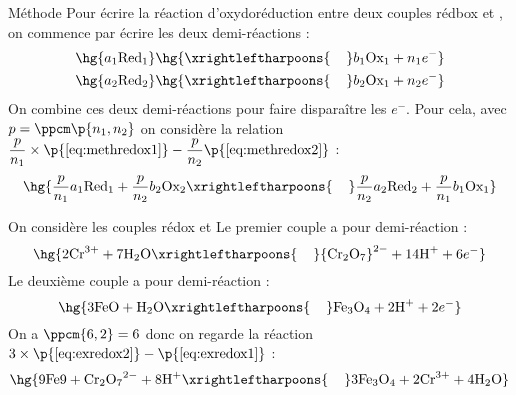     \begin{form}{Méthode}{}
        Pour écrire la réaction d'oxydoréduction entre deux couples rédbox  et , on commence par écrire les deux demi-réactions :
        \begin{align}
            \label{eq:methredox1}\hg{a_1\text{Red}_1} &\hg{\xrightleftharpoons{\hspace{0.4cm}} b_1\text{Ox}_1 + n_1e^-}\\
            \label{eq:methredox2}\hg{a_2\text{Red}_2} &\hg{\xrightleftharpoons{\hspace{0.4cm}} b_2\text{Ox}_1 + n_2e^-}
        \end{align}
        On combine ces deux demi-réactions pour faire disparaître les $e^-$. Pour cela, avec $p = \ppcm\p{n_1, n_2}$ on considère la relation $\dfrac{p}{n_1}\times\p{\ref{eq:methredox1}} - \dfrac{p}{n_2}\p{\ref{eq:methredox2}}$ :
        \[ \hg{\dfrac{p}{n_1}a_1\text{Red}_1 + \dfrac{p}{n_2}b_2\text{Ox}_2 \xrightleftharpoons{\hspace{0.4cm}} \dfrac{p}{n_2}a_2\text{Red}_2 + \dfrac{p}{n_1}b_1\text{Ox}_1} \]
    \end{form}
    \begin{example}{}{}
        On considère les couples rédox  et 
        Le premier couple a pour demi-réaction :
        \begin{equation}
            \label{eq:exredox1}\hg{2\text{Cr}^{3+} + 7\text H_2\text O \xrightleftharpoons{\hspace{0.4cm}} {\text{Cr}_2\text O_7}^{2-} + 14\text H^+ + 6e^-}
        \end{equation}
        Le deuxième couple a pour demi-réaction :
        \begin{equation}
            \label{eq:exredox2}\hg{3\text{FeO} + \text H_2\text O \xrightleftharpoons{\hspace{0.4cm}} \text{Fe}_3\text O_4 + 2\text H^+ + 2e^-}
        \end{equation}
        On a $\ppcm{6, 2} = 6$ donc on regarde la réaction $3\times\p{\ref{eq:exredox2}} - \p{\ref{eq:exredox1}}$ :
        \[ \hg{9\text{Fe9} + {\text{Cr}_2\text O_7}^{2-} + 8\text H^+ \xrightleftharpoons{\hspace{0.4cm}} 3\text{Fe}_3\text O_4 + 2\text{Cr}^{3+} + 4\text H_2\text O}\]
    \end{example}
    
